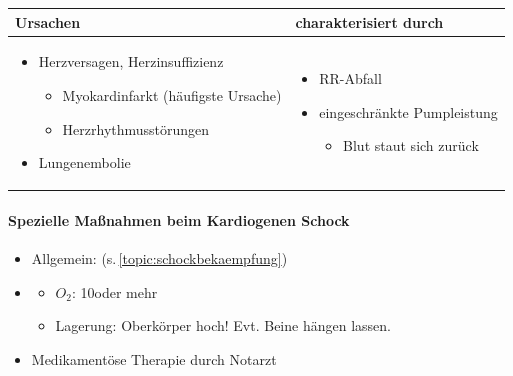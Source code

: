 \begin{center}
\begin{tabularx}{\linewidth}[H]{XX}
\toprule
Ursachen &
charakterisiert durch\\\midrule
\begin{itemize}
    \item Herzversagen, Herzinsuffizienz
    \begin{itemize}
        \item Myokardinfarkt (h\"aufigste Ursache)
        \item Herzrhythmusst\"orungen
    \end{itemize}
    \item Lungenembolie
\end{itemize}
 &
 \begin{itemize}
     \item RR-Abfall
     \item eingeschr\"ankte Pumpleistung
     \begin{itemize}
         \item Blut staut sich zur\"uck
     \end{itemize}
 \end{itemize}
\\\bottomrule
\end{tabularx}
\end{center}

\begin{gMassnahmenEnv}
\paragraph{Spezielle Ma{\ss}nahmen beim Kardiogenen Schock}

\begin{itemize}
    \item Allgemein: 
        (s.\,\ref{topic:schockbekaempfung})
    \item \gTxMassVitBes
    \begin{itemize}
        \item $O_2$: 10\gLMin   oder mehr
        \item Lagerung: Oberk\"orper hoch! Evt. Beine h\"angen  lassen.
    \end{itemize}
    \item Medikament\"ose Therapie durch Notarzt 
\end{itemize}
\end{gMassnahmenEnv}








